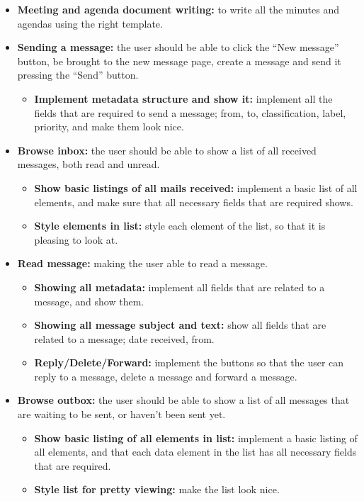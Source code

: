 \begin{itemize}
\item{}\textbf{Meeting and agenda document writing:} to write all the minutes and agendas using the right template.
\item{}\textbf{Sending a message:} the user should be able to click the “New message” button, be brought to the new message page, create a message and send it pressing the “Send” button.
\begin{itemize}
\item{}\textbf{Implement metadata structure and show it:} implement all the fields that are required to send a message; from, to, classification, label, priority, and make them look nice.
\end{itemize}
\item{}\textbf{Browse inbox:} the user should be able to show a list of all received messages, both read and unread.
\begin{itemize}
\item{}\textbf{Show basic listings of all mails received:} implement a basic list of all elements, and make sure that all necessary fields that are required shows.
\item{}\textbf{Style elements in list:} style each element of the list, so that it is pleasing to look at.
\end{itemize}
\item{}\textbf{Read message:} making the user able to read a message.
\begin{itemize}
\item{}\textbf{Showing all metadata:} implement all fields that are related to a message, and show them.
\item{}\textbf{Showing all message subject and text:} show all fields that are related to a message; date received, from. 
\item{}\textbf{Reply/Delete/Forward:} implement the buttons so that the user can reply to a message, delete a message and forward a message.
\end{itemize}
\item{}\textbf{Browse outbox:} the user should be able to show a list of all messages that are waiting to be sent, or haven’t been sent yet.
\begin{itemize}
\item{}\textbf{Show basic listing of all elements in list:} implement a basic listing of all elements, and that each data element in the list has all necessary fields that are required.
\item{}\textbf{Style list for pretty viewing:} make the list look nice.

\end{itemize}
\end{itemize}
